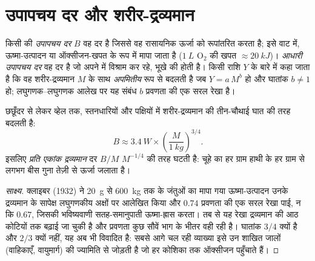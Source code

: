 \section{उपापचय दर और शरीर-द्रव्यमान}

\begin{definition}\label{def:b1:organism-environment:allometry}
किसी  की \emph{उपापचय दर} $B$ वह दर है जिससे वह
रासायनिक ऊर्जा को रूपांतरित करता है; इसे वाट में, ऊष्मा-उत्पादन या
ऑक्सीजन-खपत के रूप में मापा जाता है ($\qty{1}{L}$ $\mathrm{O_2}$ की खपत
$\approx \qty{20}{kJ}$)। \emph{आधारी उपापचय दर}
वह दर है जो अपने  में विश्राम कर रहे, भूखे  की
होती है। किसी राशि $Y$ के बारे में कहा जाता है कि वह शरीर-द्रव्यमान $M$
के साथ \emph{अपमितीय} रूप से बदलती है जब
$Y = a\,M^{b}$ हो और घातांक $b \neq 1$ हो; लघुगणक--लघुगणक आलेख पर यह
संबंध $b$ प्रवणता की एक सरल रेखा है।
\end{definition}

\begin{theorem}[क्लाइबर का नियम]\label{thm:b1:organism-environment:kleiber}
छछूँदर से लेकर व्हेल तक, स्तनधारियों और पक्षियों में 
शरीर-द्रव्यमान की तीन-चौथाई घात की तरह बदलती है:
\[
B \approx \qty{3.4}{W}\times\left(\frac{M}{\qty{1}{kg}}\right)^{3/4}.
\]
इसलिए \emph{प्रति एकांक द्रव्यमान} दर $B/M$ $M^{-1/4}$ की तरह घटती है:
चूहे का हर ग्राम हाथी के हर ग्राम से लगभग बीस गुना तेज़ी से ऊर्जा जलाता
है।
\end{theorem}
\begin{proof}[साक्ष्य]
क्लाइबर (1932) ने \qty{20}{g} से \qty{600}{kg} तक के जंतुओं का मापा गया
ऊष्मा-उत्पादन उनके द्रव्यमान के सापेक्ष लघुगणकीय अक्षों पर आलेखित किया और
$0.74$ प्रवणता की एक सरल रेखा पाई, न कि $0.67$, जिसकी भविष्यवाणी
सतह-समानुपाती ऊष्मा-ह्रास करता। तब से यह रेखा द्रव्यमान की आठ कोटियों तक
बढ़ाई जा चुकी है और प्रवणता कुछ सौवें भाग के भीतर वही रही है। घातांक
$3/4$ क्यों है और $2/3$ क्यों नहीं, यह अब भी विवादित है: सबसे आगे चल रही
व्याख्या इसे उन शाखित जालों (वाहिकाएँ, वायुमार्ग) की ज्यामिति से जोड़ती
है जो हर कोशिका तक ऑक्सीजन पहुँचाते हैं।
\end{proof}

